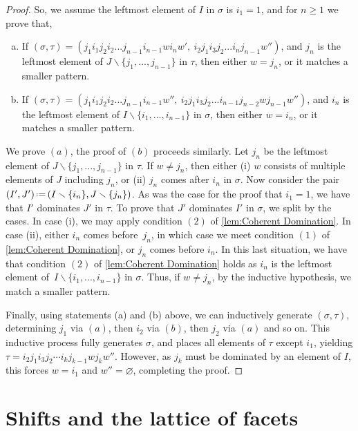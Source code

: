 \documentclass{amsart}
\theoremstyle{definition}
\newcommand{\ssm}{\smallsetminus} %
\newcommand{\eqdef}{\mbox{\,\raisebox{0.2ex}{\scriptsize\ensuremath{\mathrm:}}\ensuremath{=}\,}} %
\begin{document}
\begin{proof}
So, we assume the leftmost element of $I$ in $\sigma$ is $i_1=1$, and for $n\geq1$ we prove that,
\begin{enumerate}[(a)]
    \item If $(\sigma,\tau)=(j_1 i_1 j_2 i_2 ... j_{n-1} i_{n-1} w i_{n} w', \ i_2 j_1 i_3 j_2 ... i_{n}j_{n-1}w'') $, and $j_n$ is the leftmost element of $J\ssm \{j_1,...,j_{n-1}\}$ in $\tau$, then either $w = j_n$, or it matches a smaller pattern.
    \item If $(\sigma,\tau)=(j_1 i_1 j_2 i_2 ... j_{n-1} i_{n-1} w'', \ i_2 j_1 i_3 j_2 ... i_{n-1}j_{n-2} w j_{n-1} w'')$, and $i_n$ is the leftmost element of ${I\ssm \{i_1,...,i_{n-1}\}}$ in $\sigma$, then either $w = i_n$, or it matches a smaller pattern.
\end{enumerate}
We prove $(a)$, the proof of $(b)$ proceeds similarly. 
Let $j_n$ be the leftmost element of $J\ssm \{j_1,...,j_{n-1} \}$ in $\tau$.
If $w\neq j_n$, then either (i) $w$ consists of multiple elements of $J$ including $j_n$, or (ii) $j_n$ comes after $i_n$ in $\sigma$.
Now consider the pair $(I',J') \eqdef (I\ssm \{i_n\}, J \ssm \{j_n\})$.
As was the case for the proof that $i_1=1$, we have that $I'$ dominates $J'$ in $\tau$.
To prove that $J'$ dominates $I'$ in $\sigma$, we split by the cases.
In case (i), we may apply condition $(2)$ of \cref{lem:Coherent Domination}.
In case (ii), either $i_n$ comes before~$j_n$, in which case we meet condition $(1)$ of \cref{lem:Coherent Domination}, or $j_n$ comes before $i_n$.
In this last situation, we have that condition $(2)$ of \cref{lem:Coherent Domination} holds as $i_n$ is the leftmost element of~${I\ssm \{i_1,...,i_{n-1}\}}$ in $\sigma$.
Thus, if $w \neq j_n$, by the inductive hypothesis, we match a smaller pattern.

Finally, using statements (a) and (b) above, we can inductively generate $(\sigma,\tau)$, determining $j_1$ via $(a)$, then $i_2$ via $(b)$, then $j_2$ via $(a)$ and so on.
This inductive process fully generates $\sigma$, and places all elements of $\tau$ except $i_1$, yielding $\tau=i_2 j_1 i_3 j_2 \cdots i_k j_{k-1} w j_k w''$.
However, as $j_k$ must be dominated by an element of $I$, this forces $w = i_1$ and $w'' =\varnothing$, completing the proof.
\end{proof}


\newpage
\section{Shifts and the lattice of facets}
\label{sec:shifts}
\end{document}
